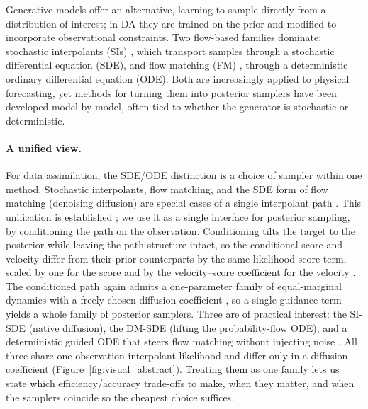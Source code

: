 Generative models offer an alternative, learning to sample directly from a distribution of interest; in DA they are trained on the prior and modified to incorporate observational constraints. Two flow-based families dominate: stochastic interpolants (SIs) \cite{albergo_stochastic_2023, albergo_building_2023, chen_probabilistic_2024}, which transport samples through a stochastic differential equation (SDE), and flow matching (FM) \cite{lipman_flow_2023}, through a deterministic ordinary differential equation (ODE). Both are increasingly applied to physical forecasting, yet methods for turning them into posterior samplers have been developed model by model, often tied to whether the generator is stochastic or deterministic.

\paragraph{A unified view.}
For data assimilation, the SDE/ODE distinction is a choice of sampler within one method. Stochastic interpolants, flow matching, and the SDE form of flow matching (denoising diffusion) are special cases of a single interpolant path \cite{albergo_stochastic_2023, lipman_flow_2023, ma_sit_2024, holderrieth_generator_2024}. This unification is established \cite{albergo_stochastic_2023, holderrieth_generator_2024}; we use it as a single interface for posterior sampling, by conditioning the path on the observation. Conditioning tilts the target to the posterior while leaving the path structure intact, so the conditional score and velocity differ from their prior counterparts by the same likelihood-score term, scaled by one for the score and by the velocity--score coefficient for the velocity \cite{albergo_stochastic_2023, ma_sit_2024}. The conditioned path again admits a one-parameter family of equal-marginal dynamics with a freely chosen diffusion coefficient \cite{song_score-based_2021}, so a single guidance term yields a whole family of posterior samplers. Three are of practical interest: the SI-SDE (native diffusion), the DM-SDE (lifting the probability-flow ODE), and a deterministic guided ODE that steers flow matching without injecting noise \cite{yan_fig_2024, pokle_training-free_2024}. All three share one observation-interpolant likelihood and differ only in a diffusion coefficient (Figure~\ref{fig:visual_abstract}). Treating them as one family lets us state which efficiency/accuracy trade-offs to make, when they matter, and when the samplers coincide so the cheapest choice suffices.


